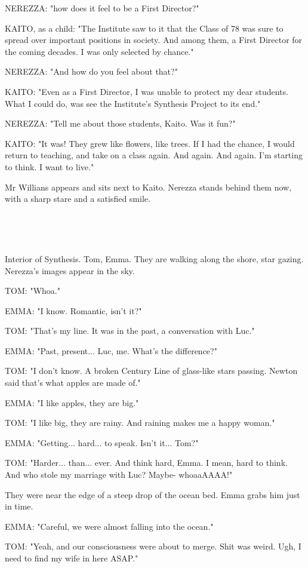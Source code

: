 \documentclass[11pt]{article}
\begin{document}
NEREZZA: "how does it feel to be a First Director?"

KAITO, as a child: "The Institute saw to it that the Class of 78 was sure to spread over important positions in society. 
And among them, a First Director for the coming decades.
I was only selected by chance."

NEREZZA: "And how do you feel about that?"

KAITO: "Even as a First Director, I was unable to protect my dear students.
What I could do, was see the Institute's Synthesis Project to its end."

NEREZZA: "Tell me about those students, Kaito. Was it fun?"

KAITO: "It was! They grew like flowers, like trees.
If I had the chance, I would return to teaching, and take on a class again.
And again.
And again.
I'm starting to think.
I want to live."

Mr Willians appears and sits next to Kaito.
Nerezza stands behind them now, with a sharp stare and a satisfied smile.

\ 

\ 

Interior of Synthesis.
Tom, Emma.
They are walking along the shore, star gazing.
Nerezza's images appear in the sky.

TOM: "Whoa."

EMMA: "I know. Romantic, isn't it?"

TOM: "That's my line.
It was in the past, a conversation with Luc."

EMMA: "Past, present... Luc, me. What's the difference?"

TOM: "I don't know. 
A broken Century Line of glass-like stars passing.
Newton said that's what apples are made of."

EMMA: "I like apples, they are big."

TOM: "I like big, they are rainy.
And raining makes me a happy woman."

EMMA: "Getting... hard... to speak. 
Isn't it... Tom?"

TOM: "Harder... than... ever.
And think hard, Emma.
I mean, hard to think.
And who stole my marriage with Luc?
Maybe- whoaaAAAA!"

They were near the edge of a steep drop of the ocean bed. 
Emma grabs him just in time.

EMMA: "Careful, we were almost falling into the ocean."

TOM: "Yeah, and our consciousness were about to merge. 
Shit was weird.
Ugh, I need to find my wife in here ASAP."
\end{document}
